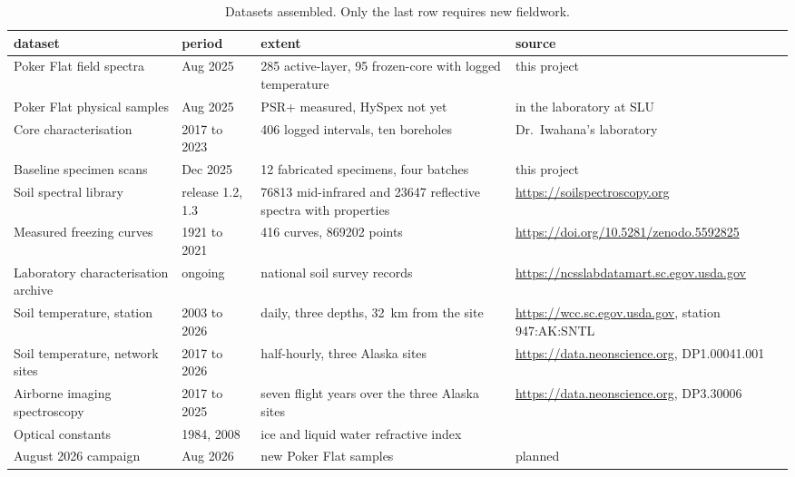 \documentclass[11pt]{article}
\begin{document}
\begin{table}[h]
\centering\small
\caption{Datasets assembled. Only the last row requires new fieldwork.}
\label{tab:data}
\begin{tabular}{p{3.4cm}p{1.9cm}p{4.0cm}p{5.1cm}}
\toprule
dataset & period & extent & source \\
\midrule
Poker Flat field spectra &
Aug 2025 &
\num{285} active-layer, \num{95} frozen-core with logged temperature &
this project \\
\addlinespace
Poker Flat physical samples &
Aug 2025 &
PSR+ measured, HySpex not yet &
in the laboratory at SLU \\
\addlinespace
Core characterisation &
2017 to 2023 &
\num{406} logged intervals, ten boreholes &
Dr.\ Iwahana's laboratory \\
\addlinespace
Baseline specimen scans &
Dec 2025 &
\num{12} fabricated specimens, four batches &
this project \\
\addlinespace
Soil spectral library &
release 1.2, 1.3 &
\num{76813} mid-infrared and \num{23647} reflective spectra with properties &
\url{https://soilspectroscopy.org} \\
\addlinespace
Measured freezing curves &
1921 to 2021 &
\num{416} curves, \num{869202} points &
\url{https://doi.org/10.5281/zenodo.5592825} \\
\addlinespace
Laboratory characterisation archive &
ongoing &
national soil survey records &
\url{https://ncsslabdatamart.sc.egov.usda.gov} \\
\addlinespace
Soil temperature, station &
2003 to 2026 &
daily, three depths, \SI{32}{\kilo\meter} from the site &
\url{https://wcc.sc.egov.usda.gov}, station 947:AK:SNTL \\
\addlinespace
Soil temperature, network sites &
2017 to 2026 &
half-hourly, three Alaska sites &
\url{https://data.neonscience.org}, DP1.00041.001 \\
\addlinespace
Airborne imaging spectroscopy &
2017 to 2025 &
seven flight years over the three Alaska sites &
\url{https://data.neonscience.org}, DP3.30006 \\
\addlinespace
Optical constants &
1984, 2008 &
ice and liquid water refractive index &
\cite{Warren_2008} \\
\addlinespace
August 2026 campaign &
Aug 2026 &
new Poker Flat samples &
planned \\
\bottomrule
\end{tabular}
\end{table}



\end{document}
